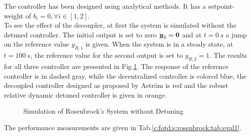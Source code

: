 The controller has been designed using analytical methods. It has a setpoint-weight of $b_i = 0, \forall i \in [1,2]$.\\

To see the effect of the decoupler, at first the system is simulated without the detuned controller.  The initial output is set to zero $\mbox{\boldmath$y$}_0 = \mbox{\boldmath$0$}$ and at $t = 0~s$ a jump on the reference value $y_{R,1}$ is given. When the system is in a steady state, at $t = 100~s$, the reference value for the second output is set to $y_{R,2} = 1$. The results for all three controller are presented in Fig.\ref{c:fotd:s:rosenbrock:f:SimNonDetuned}. The response of the reference controller is in dashed gray, while the decentralized controller is colored blue, the decoupled controller designed as proposed by Astr\"om is red and the robust relative dynamic detuned controller is given in orange.\\

\begin{figure}[H]\centering


\caption{Simulation of Rosenbrock's System without Detuning}
\label{c:fotd:s:rosenbrock:f:SimNonDetuned}
\end{figure}

The performance measurements are given in Tab.\ref{c:fotd:s:rosenbrock:tab:eval1}.


